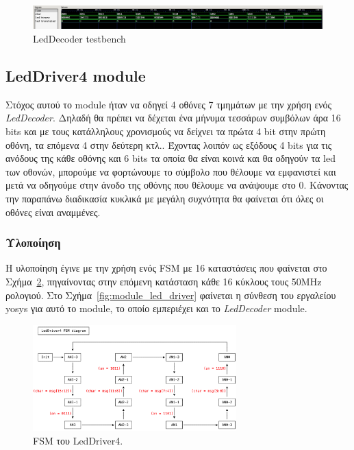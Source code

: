 \documentclass[../main.tex]{subfiles}
\begin{document}
\begin{figure}[H]
  \begin{center}
    \includegraphics[width=\textwidth]{../images/led_decoder_tb.png}
  \end{center}
  \caption{LedDecoder testbench}
  \label{fig:tb_led_decoder}
\end{figure}

\subsection{LedDriver4 module}

Στόχος αυτού το module ήταν να οδηγεί 4 οθόνες 7 τμημάτων με την χρήση ενός
\textit{LedDecoder}. Δηλαδή θα πρέπει να δέχεται ένα μήνυμα τεσσάρων συμβόλων
άρα 16 bits και με τους κατάλληλους χρονισμούς να δείχνει τα πρώτα 4 bit στην
πρώτη οθόνη, τα επόμενα 4 στην δεύτερη κτλ.. Έχοντας λοιπόν ως εξόδους 4 bits
για τις ανόδους της κάθε οθόνης και 6 bits τα οποία θα είναι κοινά και θα
οδηγούν τα led των οθονών, μπορούμε να φορτώνουμε το σύμβολο που θέλουμε να
εμφανιστεί και μετά να οδηγούμε στην άνοδο της οθόνης που θέλουμε να ανάψουμε
στο 0. Κάνοντας την παραπάνω διαδικασία κυκλικά με μεγάλη συχνότητα θα φαίνεται
ότι όλες οι οθόνες είναι αναμμένες.

\subsubsection*{Υλοποίηση}

Η υλοποίηση έγινε με την χρήση ενός FSM με 16 καταστάσεις που φαίνεται στο
Σχήμα~\ref{fig:fsm_led_driver}, πηγαίνοντας στην επόμενη κατάσταση κάθε 16
κύκλους τους 50MHz ρολογιού. Στο Σχήμα~\ref{fig:module_led_driver} φαίνεται η
σύνθεση του εργαλείου yosys για αυτό το module, το οποίο εμπεριέχει και το
\textit{LedDecoder} module.

\begin{figure}[H]
  \begin{center}
    \includegraphics[width=0.7\textwidth]{../../monodraw/LedDriver4.png}
  \end{center}
  \caption{FSM του LedDriver4.}
  \label{fig:fsm_led_driver}
\end{figure}
\end{document}
